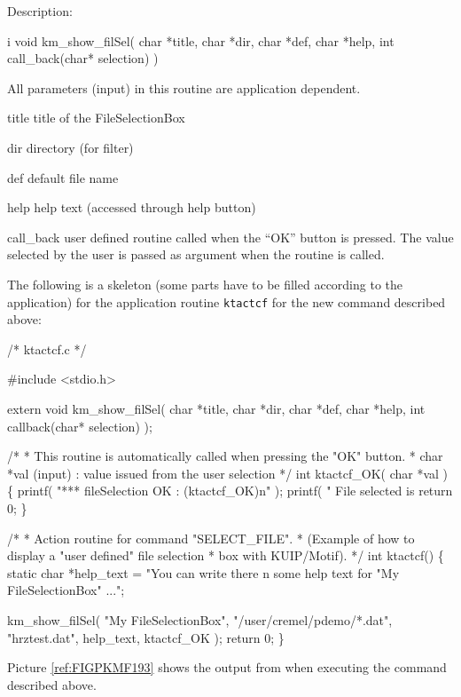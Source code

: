 Description:
\begin{Gray}{i}
void km_show_filSel( char *title, char *dir, char *def, char *help,
                     int call_back(char* selection) )
\end{Gray}
All parameters (input) in this routine are application dependent.
\Pdesc\begin{DLtt}{\mbox{\hspace{7em}}}
\item[title] title of the FileSelectionBox
\item[dir] directory (for filter)
\item[def] default file name
\item[help] help text (accessed through help button)
\item[call_back]  user defined routine called when the ``OK'' button
  is pressed. 
  The value selected by the user is passed as argument when the
  routine is called.
\end{DLtt}
 
The following is a skeleton (some parts have to be filled according to
the application) for the application routine \texttt{ktactcf} for the
new command  described above:
\begin{XMP}
/* ktactcf.c */
 
#include <stdio.h>

extern void km_show_filSel( char *title, char *dir, char *def, char *help,
                            int callback(char* selection) );


/*
 * This routine is automatically called when pressing the "OK" button.
 *      char *val (input) : value issued from the user selection
 */
int ktactcf_OK( char *val )
\{
    printf( "*** fileSelection OK : (ktactcf_OK)\bs{}n" );
    printf( "    File selected is %
    return 0;
\}
 

/*
 * Action routine for command "SELECT_FILE".
 * (Example of how to display a "user defined" file selection
 *  box with KUIP/Motif).
 */
int ktactcf()
\{
  static char *help_text = "You can write there \bs{}n\bs{}
some help text for \bs{}"My FileSelectionBox\bs{}" ...";
 
    km_show_filSel( "My FileSelectionBox",
                    "/user/cremel/pdemo/*.dat", "hrztest.dat",
                    help_text, ktactcf_OK );
    return 0;
\}
\end{XMP}
 
Picture \ref{ref:FIGPKMF193} shows the output from
\KUIPMotif{} when executing the command  described
above.

